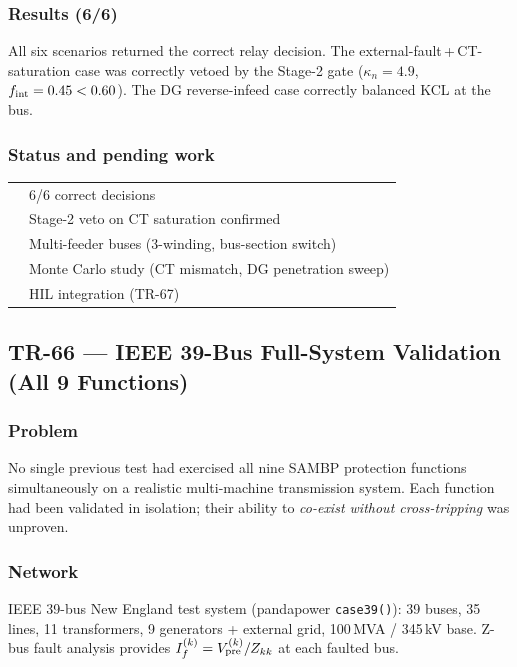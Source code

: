 \documentclass[12pt,a4paper]{article}
\newcommand{\cmark}{\ding{51}}
\newcommand{\pmark}{\ding{118}}   %
\newcommand{\kn}{\kappa_n}
\begin{document}
\subsubsection{Results (6/6)}
All six scenarios returned the correct relay decision.
The external-fault\,+\,CT-saturation case was correctly vetoed by the
Stage-2 gate ($\kn = 4.9$, $f_{\rm int} = 0.45 < 0.60$).
The DG reverse-infeed case correctly balanced KCL at the bus.

\subsubsection{Status and pending work}
\begin{tabular}{ll}
  \cmark & 6/6 correct decisions \\
  \cmark & Stage-2 veto on CT saturation confirmed \\
  \pmark & Multi-feeder buses (3-winding, bus-section switch) \\
  \pmark & Monte Carlo study (CT mismatch, DG penetration sweep) \\
  \pmark & HIL integration (TR-67) \\
\end{tabular}

\bigskip

\subsection{TR-66 — IEEE 39-Bus Full-System Validation (All 9 Functions)}
\label{sec:tr66}

\subsubsection{Problem}
No single previous test had exercised all nine SAMBP protection functions
simultaneously on a realistic multi-machine transmission system.
Each function had been validated in isolation; their ability to
\emph{co-exist without cross-tripping} was unproven.

\subsubsection{Network}
IEEE 39-bus New England test system (pandapower \texttt{case39()}):
39 buses, 35 lines, 11 transformers, 9 generators + external grid,
100\,MVA / 345\,kV base.  Z-bus fault analysis provides
$I_f^{(k)} = V_{\rm pre}^{(k)} / Z_{kk}$ at each faulted bus.
\end{document}
